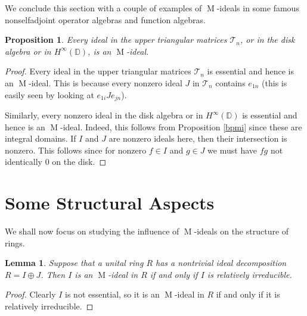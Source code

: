 \documentclass[11pt,leqno]{amsart}
\DeclareMathOperator{\m}{M}
\newcommand{\cT}{\mathcal{T}}
\newtheorem{proposition}[theorem]{Proposition}
\newtheorem{lemma}[theorem]{Lemma}
\theoremstyle{definition}
\theoremstyle{remark}
\numberwithin{equation}{section}
\numberwithin{equation}{section}
\begin{document}
We conclude this section with a couple of examples of $\m$-ideals in some famous nonselfadjoint operator algebras and function algebras.

\begin{proposition}
Every ideal in the upper triangular matrices $\cT_n$,
or in the disk algebra or in $H^\infty(\mathds{D})$, is  an 
$\m$-ideal. \end{proposition}
	
\begin{proof} 
Every ideal in the upper triangular matrices $\cT_n$ is essential and hence is an 
$\m$-ideal.   This is because every nonzero ideal $J$ in $\cT_n$ contains $e_{1n}$ (this is easily seen by looking at $e_{1i} J e_{jn}$).

Similarly,  every nonzero ideal in the disk algebra or in $H^\infty(\mathds{D})$ is essential and hence is an 
$\m$-ideal.   Indeed, this follows from Proposition \ref{bpmi} since these are integral domains.  If $I$ and $J$ are nonzero ideals here, then their intersection is nonzero.
This follows since for nonzero $f \in I$ and $g \in J$ we must have $fg$ not identically $0$ on the disk. 
\end{proof}

\section{Some Structural Aspects}

We shall now focus on studying the influence of $\m$-ideals on the structure of rings.

\begin{lemma}
\label{pros}
Suppose that a unital ring $R$ has a nontrivial ideal decomposition $R = I \oplus J$.  Then $I$ is an $\m$-ideal in $R$ if and only if $I$ is relatively irreducible.
\end{lemma}

\begin{proof} Clearly $I$ is not essential, so it is 
an $\m$-ideal in $R$ if and only if it is relatively irreducible.  
\end{proof}
\end{document}
